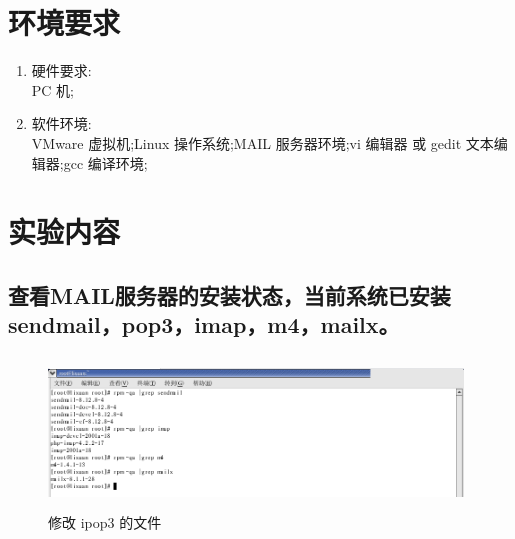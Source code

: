 \documentclass{article}
\begin{document}
\section{环境要求}
\begin{enumerate}
    \item 硬件要求: \\
    PC 机; 
    \item 软件环境: \\
    VMware 虚拟机;Linux 操作系统;MAIL 服务器环境;vi 编辑器 或 gedit 文本编辑器;gcc 编译环境; 
\end{enumerate}
\section{实验内容}
\subsection{查看MAIL服务器的安装状态，当前系统已安装sendmail，pop3，imap，m4，mailx。}
\begin{figure}[h]
    \centering
    \includegraphics[width=11cm,height=4cm]{13.png}
    \caption{修改 ipop3 的文件}
\end{figure}
\end{document}
